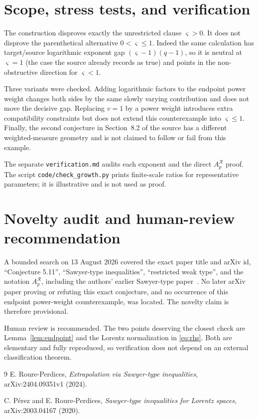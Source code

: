 \documentclass[11pt]{article}
\newcommand{\AR}{A^{\mathcal R}}
\begin{document}
\section{Scope, stress tests, and verification}

The construction disproves exactly the unrestricted clause $\varsigma>0$.
It does not disprove the parenthetical alternative $0<\varsigma\leq1$.
Indeed the same calculation has target/source logarithmic exponent gap
$(\varsigma-1)(q-1)$, so it is neutral at $\varsigma=1$ (the case the source
already records as true) and points in the non-obstructive direction for
$\varsigma<1$.

Three variants were checked.  Adding logarithmic factors to the endpoint
power weight changes both sides by the same slowly varying contribution and
does not move the decisive gap.  Replacing $v=1$ by a power weight introduces
extra compatibility constraints but does not extend this counterexample into
$\varsigma\leq1$.  Finally, the second conjecture in Section~8.2 of the source
has a different weighted-measure geometry and is not claimed to follow or
fail from this example.

The separate \texttt{verification.md} audits each exponent and the direct
$\AR_p$ proof.  The script \texttt{code/check\_growth.py} prints finite-scale
ratios for representative parameters; it is illustrative and is not used as
proof.

\section{Novelty audit and human-review recommendation}

A bounded search on 13 August 2026 covered the exact paper title and arXiv id,
``Conjecture 5.11'', ``Sawyer-type inequalities'', ``restricted weak type'',
and the notation $A_p^{\mathcal R}$, including the authors' earlier
Sawyer-type paper~\cite{PerezRoure}.  No later arXiv paper proving or refuting
this exact conjecture, and no occurrence of this endpoint power-weight
counterexample, was located.  The novelty claim is therefore provisional.

Human review is recommended.  The two points deserving the closest check are
Lemma~\ref{lem:endpoint} and the Lorentz normalization in
\eqref{eq:rhs}.  Both are elementary and fully reproduced, so verification
does not depend on an external classification theorem.

\begin{thebibliography}{9}
E. Roure-Perdices,
\emph{Extrapolation via Sawyer-type inequalities},
arXiv:2404.09351v1 (2024).

C. P\'erez and E. Roure-Perdices,
\emph{Sawyer-type inequalities for Lorentz spaces},
arXiv:2003.04167 (2020).
\end{thebibliography}
\end{document}
